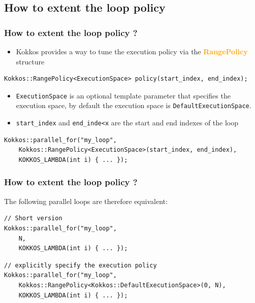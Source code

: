 \documentclass[aspectratio=169]{beamer}
\newcommand{\highlight}[1]{\textcolor{orange}{\textbf{#1}}}
\begin{document}
\subsection[Extended loop policy]{How to extent the loop policy}


\begin{frame}[fragile]
    \frametitle{How to extent the loop policy ?}

\begin{itemize}
    \item Kokkos provides a way to tune the execution policy via the \highlight{RangePolicy} structure
\end{itemize}

\small
\begin{verbatim}
Kokkos::RangePolicy<ExecutionSpace> policy(start_index, end_index);
\end{verbatim}

\begin{itemize}
    \item \texttt{ExecutionSpace} is an optional template parameter that specifies the execution space, by default the execution space is \texttt{DefaultExecutionSpace}.
    \item \texttt{start\_index} and \texttt{end\_inde<x} are the start and end indexes of the loop
\end{itemize}

\small
\begin{verbatim}
Kokkos::parallel_for("my_loop", 
    Kokkos::RangePolicy<ExecutionSpace>(start_index, end_index),
    KOKKOS_LAMBDA(int i) { ... });
\end{verbatim}

\end{frame}


\begin{frame}[fragile]
    \frametitle{How to extent the loop policy ?}

The following parallel loops are therefore equivalent:

\small
\begin{verbatim}
// Short version
Kokkos::parallel_for("my_loop", 
    N,
    KOKKOS_LAMBDA(int i) { ... });
\end{verbatim}

\begin{verbatim}
// explicitly specify the execution policy
Kokkos::parallel_for("my_loop", 
    Kokkos::RangePolicy<Kokkos::DefaultExecutionSpace>(0, N),
    KOKKOS_LAMBDA(int i) { ... });
\end{verbatim}

\end{frame}
\end{document}
